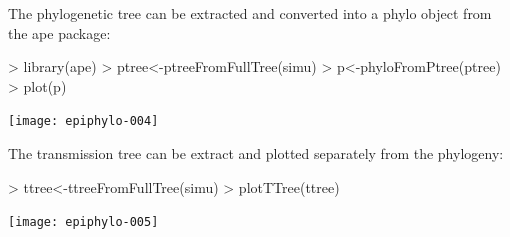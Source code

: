 \documentclass[a4paper]{article}
\begin{document}
The phylogenetic tree can be extracted and converted into a phylo object from the ape package:

\begin{Schunk}
\begin{Sinput}
> library(ape)
> ptree<-ptreeFromFullTree(simu)
> p<-phyloFromPtree(ptree)
> plot(p)
\end{Sinput}
\end{Schunk}
\texttt{[image: epiphylo-004]}

The transmission tree can be extract and plotted separately from the phylogeny:

\begin{Schunk}
\begin{Sinput}
> ttree<-ttreeFromFullTree(simu)
> plotTTree(ttree)
\end{Sinput}
\end{Schunk}
\texttt{[image: epiphylo-005]}
\end{document}
